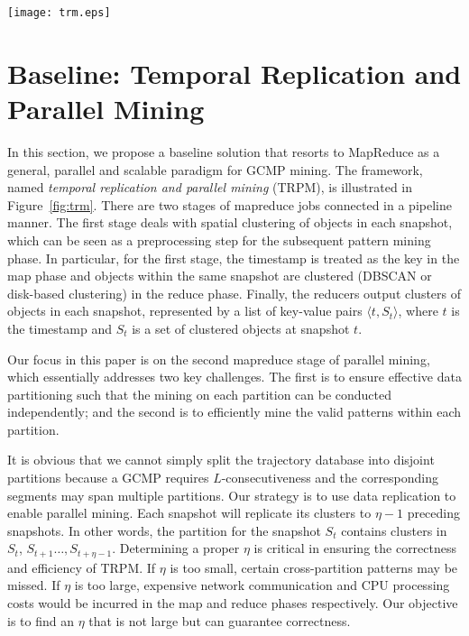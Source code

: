 \begin{figure*} [t]
\center
\texttt{[image: trm.eps]}
\caption{Workflow of Temporal Replication and Parallel Mining (TRPM). (a) and (b) correspond to the first mapreduce stage which clusters objects in each snapshot.  (c) and (d) is the second mapreduce stage which uses TRPM to detect GCMPs.}
\label{fig:trm}
\end{figure*}

\section{Baseline: Temporal Replication and Parallel Mining}
\label{sec:trm}
In this section, we propose a baseline solution that resorts to MapReduce as a general, parallel and scalable paradigm for GCMP mining. The framework, named \textit{temporal replication and parallel mining} (TRPM), is illustrated in   Figure~\ref{fig:trm}. There are two stages of mapreduce jobs connected in a pipeline manner. The first stage deals with spatial clustering of objects in each snapshot, which can be seen as a preprocessing step for the subsequent pattern mining phase. In particular, for the first stage, the timestamp is treated as the key in the map phase and objects within the same snapshot are clustered (DBSCAN or disk-based clustering) in the reduce phase. Finally, the reducers output clusters of objects in each snapshot, represented by a list of key-value pairs $\langle t, S_t  \rangle$, where $t$ is the timestamp and $S_t$ is a set of clustered objects at snapshot $t$. 

Our focus in this paper is on the second mapreduce stage of parallel mining, which essentially addresses two key challenges. The first is to ensure effective data partitioning such that the mining on each partition can be conducted independently; and the second is to efficiently mine the valid patterns within each partition. 

It is obvious that we cannot simply split the trajectory database 
into disjoint partitions because a GCMP requires $L$-consecutiveness 
and the corresponding segments may span multiple partitions. 
Our strategy is to use data replication to enable parallel mining. 
Each snapshot will replicate its clusters to $\eta-1$ preceding snapshots.
In other words, the partition for the snapshot $S_t$ contains clusters 
in $S_t$, $S_{t+1}\ldots,S_{t+\eta-1}$. 
Determining a proper $\eta$ is critical in ensuring the
correctness and efficiency of TRPM. If $\eta$ is too small, 
certain cross-partition patterns may be missed. 
If $\eta$ is too large, expensive network communication and 
CPU processing costs would be incurred in the map and reduce phases respectively. Our objective is to find an $\eta$ that is not large but can guarantee correctness.

